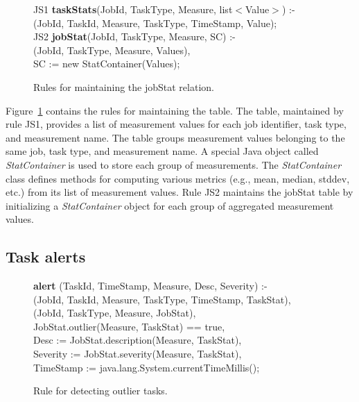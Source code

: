 \begin{figure}
\ssp
\centering
\begin{boxedminipage}{\linewidth}
JS1 {\bf taskStats}(JobId, TaskType, Measure, list$<$Value$>$) :- \\
(JobId, TaskId, Measure, TaskType, TimeStamp, Value); \\

        
JS2 {\bf jobStat}(JobId, TaskType, Measure, SC) :- \\
(JobId, TaskType, Measure, Values), \\
\datalogspace SC := new StatContainer(Values); \\ 
        
\end{boxedminipage}
\caption{\label{ch:hop:fig:jobstat} Rules for maintaining the jobStat relation.}
\end{figure}

Figure~\ref{ch:hop:fig:jobstat} contains the rules for maintaining the  table. 
The  table, maintained by rule JS1, provides a list of measurement values 
for each job identifier, task type, and measurement name. The  table groups
measurement values belonging to the same job, task type, and measurement name. 
A special Java object called {\em StatContainer} is used to store each group of measurements. 
The {\em StatContainer} class defines methods for computing various metrics (e.g., mean, median, stddev, etc.)
from its list of measurement values. Rule JS2 maintains the jobStat table by initializing a {\em StatContainer} object 
for each group of aggregated measurement values.


\subsection{Task alerts} 

\begin{figure}
\ssp
\centering
\begin{boxedminipage}{\linewidth}
{\bf alert} (TaskId, TimeStamp, Measure, Desc, Severity) :- \\
(JobId, TaskId, Measure, TaskType, TimeStamp, TaskStat), \\
(JobId, TaskType, Measure, JobStat),  \\
\datalogspace JobStat.outlier(Measure, TaskStat) == true, \\
\datalogspace Desc := JobStat.description(Measure, TaskStat), \\
\datalogspace Severity := JobStat.severity(Measure, TaskStat), \\
\datalogspace TimeStamp := java.lang.System.currentTimeMillis(); \\
\end{boxedminipage}
\caption{\label{ch:hop:fig:outlier} Rule for detecting outlier tasks. }
\end{figure}

